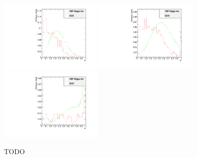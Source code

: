 \begin{figure}[!htb]
\centering
\includegraphics[width=0.45\textwidth]{Chapter06/TrackVariables/Images/BB_Tracks1_TracksERatio.pdf}
\includegraphics[width=0.45\textwidth]{Chapter06/TrackVariables/Images/BE_Tracks1_TracksERatio.pdf} \\
\includegraphics[width=0.45\textwidth]{Chapter06/TrackVariables/Images/EE_Tracks1_TracksERatio.pdf}
\caption{TODO}
\label{FIGURE:PreparationParkedDataAnalysis_TrackDistributionVariables_Acceptance}
\end{figure}

